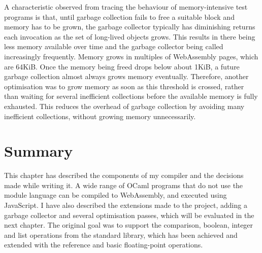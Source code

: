 A characteristic observed from tracing the behaviour of memory-intensive test programs is that, until garbage collection fails to free a suitable block and memory has to be grown, the garbage collector typically has diminishing returns each invocation as the set of long-lived objects grows. This results in there being less memory available over time and the garbage collector being called increasingly frequently.
Memory grows in multiples of WebAssembly pages, which are 64KiB. 
Once the memory being freed drops below about 1KiB, a future garbage collection almost always grows memory eventually. Therefore, another optimisation was to grow memory as soon as this threshold is crossed, rather than waiting for several inefficient collections before the available memory is fully exhausted. This reduces the overhead of garbage collection by avoiding many inefficient collections, without growing memory unnecessarily.


\newpage
\section{Summary}
This chapter has described the components of my compiler and the decisions made while writing it. A wide range of OCaml programs that do not use the module language can be compiled to WebAssembly, and executed using JavaScript. I have also described the extensions made to the project, adding a garbage collector and several optimisation passes, which will be evaluated in the next chapter. The original goal was to support the comparison, boolean, integer and list operations from the standard library, which has been achieved and extended with the reference and basic floating-point operations.


